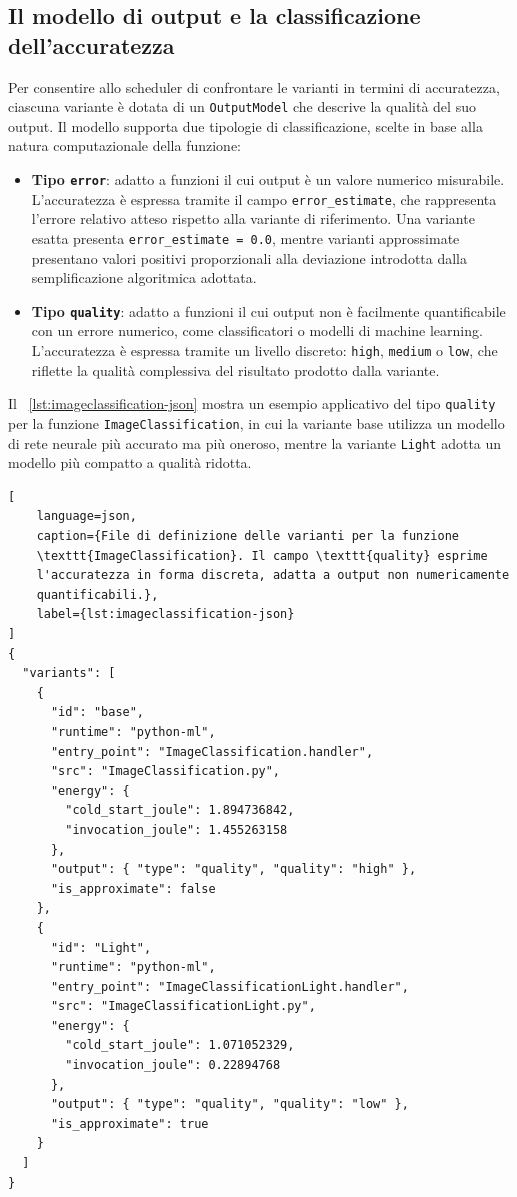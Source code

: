 \subsection{Il modello di output e la classificazione dell'accuratezza}
\label{sec:output-model}

Per consentire allo scheduler di confrontare le varianti in termini di 
accuratezza, ciascuna variante è dotata di un \texttt{OutputModel} che 
descrive la qualità del suo output. Il modello supporta due tipologie 
di classificazione, scelte in base alla natura computazionale della 
funzione:

\begin{itemize}
    \item \textbf{Tipo \texttt{error}}: adatto a funzioni il cui output 
    è un valore numerico misurabile. L'accuratezza è espressa tramite 
    il campo \texttt{error\_estimate}, che rappresenta l'errore relativo 
    atteso rispetto alla variante di riferimento. Una variante esatta 
    presenta \texttt{error\_estimate = 0.0}, mentre varianti approssimate 
    presentano valori positivi proporzionali alla deviazione introdotta 
    dalla semplificazione algoritmica adottata.

    \item \textbf{Tipo \texttt{quality}}: adatto a funzioni il cui 
    output non è facilmente quantificabile con un errore numerico, 
    come classificatori o modelli di machine learning. L'accuratezza 
    è espressa tramite un livello discreto: \texttt{high}, 
    \texttt{medium} o \texttt{low}, che riflette la qualità complessiva 
    del risultato prodotto dalla variante.
\end{itemize}

Il ~\autoref{lst:imageclassification-json} mostra un esempio 
applicativo del tipo \texttt{quality} per la funzione 
\texttt{ImageClassification}, in cui la variante base utilizza un 
modello di rete neurale più accurato ma più oneroso, mentre la 
variante \texttt{Light} adotta un modello più compatto a qualità ridotta.

\begin{lstlisting}[
    language=json,
    caption={File di definizione delle varianti per la funzione 
    \texttt{ImageClassification}. Il campo \texttt{quality} esprime 
    l'accuratezza in forma discreta, adatta a output non numericamente 
    quantificabili.},
    label={lst:imageclassification-json}
]
{
  "variants": [
    {
      "id": "base",
      "runtime": "python-ml",
      "entry_point": "ImageClassification.handler",
      "src": "ImageClassification.py",
      "energy": {
        "cold_start_joule": 1.894736842,
        "invocation_joule": 1.455263158
      },
      "output": { "type": "quality", "quality": "high" },
      "is_approximate": false
    },
    {
      "id": "Light",
      "runtime": "python-ml",
      "entry_point": "ImageClassificationLight.handler",
      "src": "ImageClassificationLight.py",
      "energy": {
        "cold_start_joule": 1.071052329,
        "invocation_joule": 0.22894768
      },
      "output": { "type": "quality", "quality": "low" },
      "is_approximate": true
    }
  ]
}
\end{lstlisting}

